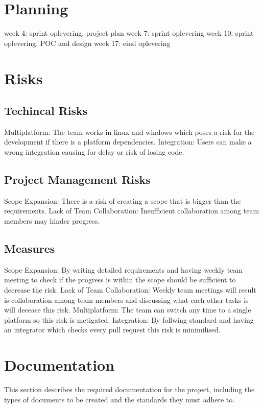 \documentclass{projdoc}
\begin{document}
\section{Planning}
week 4: sprint oplevering, project plan
week 7: sprint oplevering
week 10: sprint oplevering, POC and design
week 17: eind oplevering



\section{Risks}
\subsection{Techincal Risks}
Multiplatform: The team works in linux and windows which poses a risk for the development if there is a platform dependencies.
Integration: Users can make a wrong integration causing for delay or risk of losing code.

\subsection{Project Management Risks}
Scope Expansion: There is a risk of creating a scope that is bigger than the requirements.
Lack of Team Collaboration: Insufficient collaboration among team members 
may hinder progress.
\subsection{Measures}
Scope Expansion: By writing detailed requirements and having weekly team meeting to check if the progress is within the scope should be sufficient to decrease the risk.
Lack of Team Collaboration: Weekly team meetings will result is collaboration among team members and discussing what each other tasks is will decease this risk.
Multiplatform: The team can switch any time to a single platform so this risk is metigated. 
Integration: By follwing standard and having an integrator which checks every pull request this risk is minimilised.

\section{Documentation}

This section describes the required documentation for the project, including the
 types of documents to be created and the standards they must adhere to.
\end{document}
